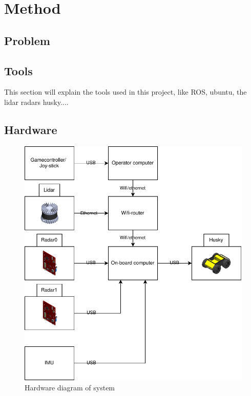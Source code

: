 \chapter{Method}
\section{Problem}

\section{Tools}
This section will explain the tools used in this project, like ROS, ubuntu, the lidar radars husky....

\section{Hardware}

\begin{figure}[H]
    \centering
    \includegraphics[scale=1]{Figures/draw.io/hardwareBlockDiagram.drawio.pdf}
    \caption{Hardware diagram of system}
    \label{fig:HWdiagram}
\end{figure}

